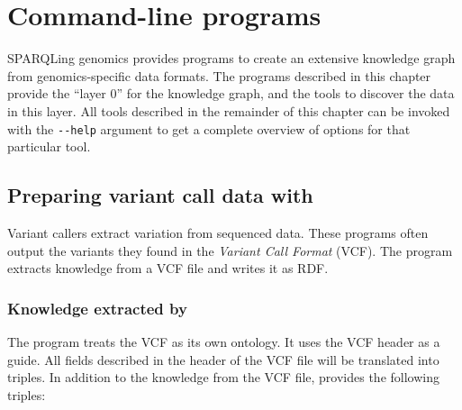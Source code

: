 \chapter{Command-line programs}
\label{chap:command-line}

  SPARQLing genomics provides programs to create an extensive knowledge graph
  from genomics-specific data formats.  The programs described in this chapter
  provide the ``layer 0'' for the knowledge graph, and the tools to discover
  the data in this layer.   All tools described in the remainder of this
  chapter can be invoked with the \texttt{-{}-help} argument to get a complete
  overview of options for that particular tool.

\section{Preparing variant call data with }
\label{sec:vcf2rdf}

  Variant callers extract variation from sequenced data.  These programs
  often output the variants they found in the \emph{Variant Call Format}
  (VCF).  The  program extracts knowledge from a VCF file
  and writes it as RDF.

\subsection{Knowledge extracted by }

  The program treats the VCF as its own ontology.  It uses the VCF header as
  a guide.  All fields described in the header of the VCF file will be
  translated into triples.  In addition to the knowledge from the VCF file,
   provides the following triples:

